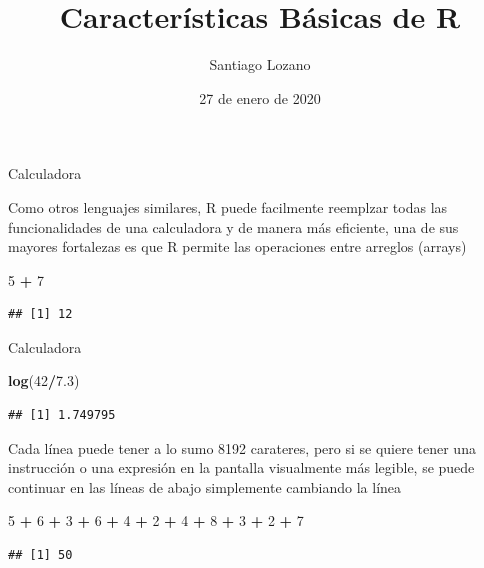 \documentclass[ignorenonframetext,]{beamer}
\title{Características Básicas de R}
\author{Santiago Lozano}
\date{27 de enero de 2020}
\newenvironment{Shaded}{\begin{snugshade}}{\end{snugshade}}
\newcommand{\KeywordTok}[1]{\textcolor[rgb]{0.13,0.29,0.53}{\textbf{#1}}}
\newcommand{\DecValTok}[1]{\textcolor[rgb]{0.00,0.00,0.81}{#1}}
\newcommand{\FloatTok}[1]{\textcolor[rgb]{0.00,0.00,0.81}{#1}}
\newcommand{\StringTok}[1]{\textcolor[rgb]{0.31,0.60,0.02}{#1}}
\newcommand{\OperatorTok}[1]{\textcolor[rgb]{0.81,0.36,0.00}{\textbf{#1}}}
\newcommand{\NormalTok}[1]{#1}
\begin{document}
\frame{\titlepage}

\begin{frame}[fragile]{Calculadora}

Como otros lenguajes similares, R puede facilmente reemplzar todas las
funcionalidades de una calculadora y de manera más eficiente, una de sus
mayores fortalezas es que R permite las operaciones entre arreglos
(arrays)

\begin{Shaded}
\begin{Highlighting}[]
\DecValTok{5} \OperatorTok{+}\StringTok{ }\DecValTok{7}
\end{Highlighting}
\end{Shaded}

\begin{verbatim}
## [1] 12
\end{verbatim}

\end{frame}

\begin{frame}[fragile]{Calculadora}

\begin{Shaded}
\begin{Highlighting}[]
\KeywordTok{log}\NormalTok{(}\DecValTok{42}\OperatorTok{/}\FloatTok{7.3}\NormalTok{)}
\end{Highlighting}
\end{Shaded}

\begin{verbatim}
## [1] 1.749795
\end{verbatim}

Cada línea puede tener a lo sumo 8192 carateres, pero si se quiere tener
una instrucción o una expresión en la pantalla visualmente más legible,
se puede continuar en las líneas de abajo simplemente cambiando la línea

\begin{Shaded}
\begin{Highlighting}[]
\DecValTok{5} \OperatorTok{+}\StringTok{ }\DecValTok{6} \OperatorTok{+}\StringTok{ }\DecValTok{3} \OperatorTok{+}\StringTok{ }\DecValTok{6} \OperatorTok{+}\StringTok{ }\DecValTok{4} \OperatorTok{+}\StringTok{ }\DecValTok{2} \OperatorTok{+}\StringTok{ }\DecValTok{4} \OperatorTok{+}\StringTok{ }\DecValTok{8} \OperatorTok{+}
\StringTok{  }\DecValTok{3} \OperatorTok{+}\StringTok{ }\DecValTok{2} \OperatorTok{+}\StringTok{ }\DecValTok{7}
\end{Highlighting}
\end{Shaded}

\begin{verbatim}
## [1] 50
\end{verbatim}

\end{frame}
\end{document}

